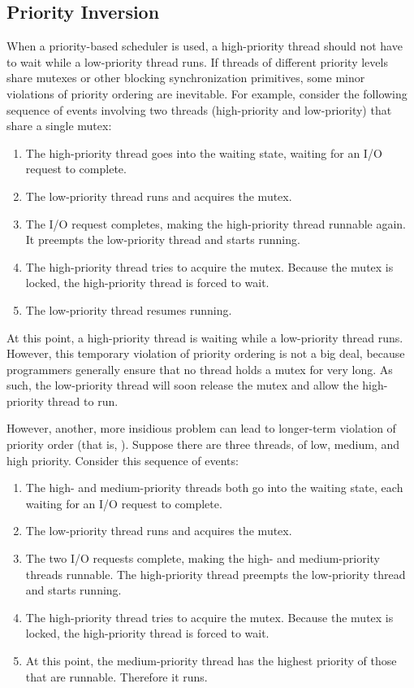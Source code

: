 \subsection{Priority Inversion}

When a priority-based scheduler is used, a high-priority thread should
not have to wait while a low-priority thread runs.  If threads of
different priority levels share mutexes or other blocking synchronization
primitives, some minor violations of priority ordering are
inevitable.  For example, consider the following sequence of events
involving two threads (high-priority and low-priority) that share a
single mutex:
\begin{enumerate}
\item
The high-priority thread goes into the waiting state, waiting for an
I/O request to complete.
\item
The low-priority thread runs and acquires the mutex.
\item
The I/O request completes, making the high-priority thread runnable
again.  It preempts the low-priority thread and starts running.
\item
The high-priority thread tries to acquire the mutex.  Because the mutex
is locked, the high-priority thread is forced to wait.
\item
The low-priority thread resumes running.
\end{enumerate}
At this point, a high-priority thread is waiting while a low-priority
thread runs.  However, this temporary violation of priority ordering
is not a big deal, because programmers generally ensure that no thread
holds a mutex for very long.  As such, the low-priority thread will
soon release the mutex and allow the high-priority thread to run.

However, another, more insidious problem can lead to longer-term
violation of priority order (that is, ).  Suppose
there are three threads, of low, medium, and high priority.  Consider this
sequence of events:
\begin{enumerate}
\item
The high- and medium-priority threads both go into the waiting state,
each waiting for an I/O request to complete.
\item
The low-priority thread runs and acquires the mutex.
\item
The two I/O requests complete, making the high- and medium-priority
threads runnable.  The high-priority thread preempts the low-priority
thread and starts running.
\item
The high-priority thread tries to acquire the mutex.  Because the mutex
is locked, the high-priority thread is forced to wait.
\item
At this point, the medium-priority thread has the highest priority of
those that are runnable.  Therefore it runs.
\end{enumerate}

